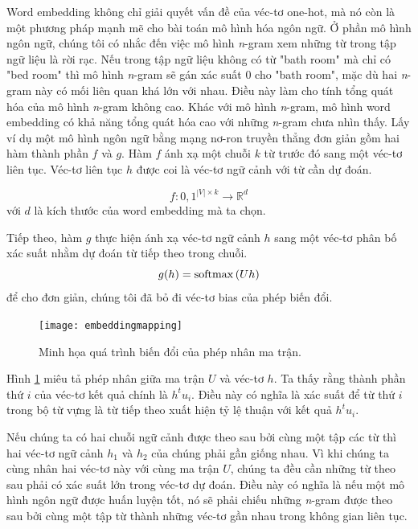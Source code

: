 Word embedding không chỉ giải quyết vấn đề của véc-tơ one-hot, mà nó còn là một phương pháp mạnh mẽ cho bài toán mô hình hóa ngôn ngữ. Ở phần mô hình ngôn ngữ, chúng tôi có nhắc đến việc mô hình \textit{n}-gram xem những từ trong tập ngữ liệu là rời rạc. Nếu trong tập ngữ liệu không có từ "bath room" mà chỉ có "bed room" thì mô hình \textit{n}-gram sẽ gán xác suất $0$ cho "bath room", mặc dù hai \textit{n}-gram này có mối liên quan khá lớn với nhau. Điều này làm cho tính tổng quát hóa của mô hình \textit{n}-gram không cao. Khác với mô hình \textit{n}-gram, mô hình word embedding có khả năng tổng quát hóa cao với những \textit{n}-gram chưa nhìn thấy. Lấy ví dụ một mô hình ngôn ngữ bằng mạng nơ-ron truyền thẳng đơn giản gồm hai hàm thành phần $f$ và $g$. Hàm $f$ ánh xạ một chuỗi $k$ từ trước đó sang một véc-tơ liên tục. Véc-tơ liên tục $h$ được coi là véc-tơ ngữ cảnh với từ cần dự đoán.

\begin{equation} \label{contextvectorfnnlm1}
f: {0,1}^{|V| \times k} \rightarrow \mathbb{R}^{d}
\end{equation}
với $d$ là kích thước của word embedding mà ta chọn.

Tiếp theo, hàm $g$ thực hiện ánh xạ véc-tơ ngữ cảnh $h$ sang một véc-tơ phân bố xác suất nhằm dự đoán từ tiếp theo trong chuỗi.
\begin{equation} \label{contextvectorfnnlm2}
g(h) = \mathrm{softmax} \left(Uh \right)
\end{equation}
để cho đơn giản, chúng tôi đã bỏ đi véc-tơ bias của phép biến đổi.

\begin{figure}
	\centering
	\texttt{[image: embeddingmapping]}
	\caption[Minh họa quá trình biến đổi của phép nhân ma trận]{Minh họa quá trình biến đổi của phép nhân ma trận.}
	\label{fig_embedding_mapping}
\end{figure}

Hình \ref{fig_embedding_mapping} miêu tả phép nhân giữa ma trận $U$ và véc-tơ $h$. Ta thấy rằng thành phần thứ $i$ của véc-tơ kết quả chính là $h^tu_i$. Điều này có nghĩa là xác suất để từ thứ $i$ trong bộ từ vựng là từ tiếp theo xuất hiện tỷ lệ thuận với kết quả $h^tu_i$.

Nếu chúng ta có hai chuỗi ngữ cảnh được theo sau bởi cùng  một tập các từ thì hai véc-tơ ngữ cảnh $h_1$ và $h_2$ của chúng phải gần giống nhau. Vì khi chúng ta cùng nhân hai véc-tơ này với cùng ma trận $U$, chúng ta đều cần những từ theo sau phải có xác suất lớn trong véc-tơ dự đoán. Điều này có nghĩa là nếu một mô hình ngôn ngữ được huấn luyện tốt, nó sẽ phải chiếu những \textit{n}-gram được theo sau bởi cùng một tập từ thành những véc-tơ gần nhau trong không gian liên tục.

